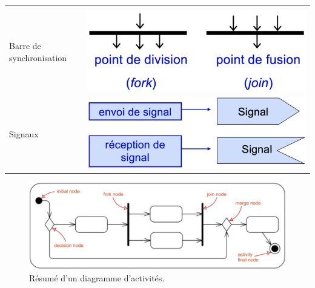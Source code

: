 \begin{table}[H]
\begin{adjustbox}{max width= \textwidth}
\begin{tabular}{l|c}
\begin{minipage}{0.5\textwidth}
\end{minipage}\\
\cmidrule(lr){1-2}
Barre de synchronisation & 
\begin{minipage}{0.5\textwidth}
	\includegraphics[width=\textwidth]{./Images/Diagrammes/diagram_activite_elements_barresynchro.png}
\end{minipage}\\
\cmidrule(lr){1-2}
Signaux & 
\begin{minipage}{0.5\textwidth}
	\includegraphics[width=\textwidth]{./Images/Diagrammes/diagram_activite_elements_signaux.png}
\end{minipage}\\
			\bottomrule
		\end{tabular}
	\end{adjustbox}
\end{table}


\begin{figure}[H]
	\includegraphics[width=\textwidth]{./Images/Diagrammes/diagram_activite_resume.png}
	\caption{R\'esum\'e d'un diagramme d'activit\'es.}
	\label{fig:diagram_activite_commente}
\end{figure}

